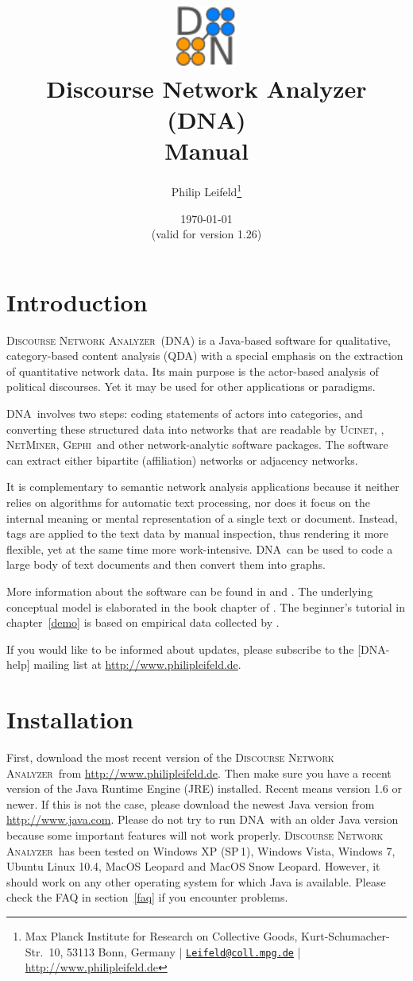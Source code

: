 \documentclass[12pt,a4paper]{scrreprt}
\author{Philip Leifeld\footnote{Max Planck Institute for Research on Collective Goods, Kurt-Schumacher-Str.~10, 53113 Bonn, Germany | \href{mailto:Leifeld@coll.mpg.de}{\texttt{Leifeld@coll.mpg.de}} | \url{http://www.philipleifeld.de}}}
\title{\includegraphics[width=2cm]{dna32.pdf}\\ \vspace{0.5cm} Discourse Network Analyzer (DNA)\\ \vspace{0.3cm} \textbf{Manual}}
\date{\today\\ \vspace{0.3cm} (valid for version 1.26)}
\newcommand{\visone}
{\textsf%
 {\protect\raisebox{.5ex}{\color[rgb]{0.1,0.1,0.1}v}%
  \protect\raisebox{.1ex}{\color[rgb]{0.3,0.3,0.3}i}%
  \protect\raisebox{-.1ex}{\color[rgb]{0.1,0.1,0.1}s}%
  \protect\raisebox{.1ex}{\color[rgb]{0.3,0.3,0.3}o}%
  \protect\raisebox{-.1ex}{\color[rgb]{0.1,0.1,0.1}n}%
  \protect\raisebox{-.4ex}{\color[rgb]{0.3,0.3,0.3}e}%
 }%
}
\newcommand{\ucinet}{\textsc{Ucinet}}
\newcommand{\dnalong}{\textsc{Discourse} \textsc{Network} \textsc{Analyzer}}
\newcommand{\dnashort}{\textsc{DNA}}
\newcommand{\netminer}{\textsc{NetMiner}}
\newcommand{\gephi}{\textsc{Gephi}}
\begin{document}
\maketitle
\setcounter{tocdepth}{2}
\tableofcontents

\chapter{Introduction}
\dnalong\ (\dnashort) is a Java-based software for qualitative, category-based content analysis (QDA) with a special emphasis on the extraction of quantitative network data. Its main purpose is the actor-based analysis of political discourses. Yet it may be used for other applications or paradigms.

\dnashort\ involves two steps: coding statements of actors into categories, and converting these structured data into networks that are readable by \ucinet, \visone, \netminer, \gephi\ and other network-analytic software packages. The software can extract either bipartite (affiliation) networks or adjacency networks.

It is complementary to semantic network analysis applications because it neither relies on algorithms for automatic text processing, nor does it focus on the internal meaning or mental representation of a single text or document. Instead, tags are applied to the text data by manual inspection, thus rendering it more flexible, yet at the same time more work-intensive. \dnashort\ can be used to code a large body of text documents and then convert them into graphs.

More information about the software can be found in \citet{leifeld2009die,leifeld2010political} and \citet{leifeld2010comparison}. The underlying conceptual model is elaborated in the book chapter of \citet{janning2009diskursnetzwerkanalyse.}. The beginner's tutorial in chapter~\ref{demo} is based on empirical data collected by \citet{fisher2009understanding}.

If you would like to be informed about updates, please subscribe to the [DNA-help] mailing list at \url{http://www.philipleifeld.de}.


\chapter{Installation}\label{installation}
First, download the most recent version of the \dnalong\ from \url{http://www.philipleifeld.de}. Then make sure you have a recent version of the Java Runtime Engine (JRE) installed. Recent means version 1.6 or newer. If this is not the case, please download the newest Java version from \url{http://www.java.com}. Please do not try to run \dnashort\ with an older Java version because some important features will not work properly. \dnalong\ has been tested on Windows XP (SP\,1), Windows Vista, Windows 7, Ubuntu Linux 10.4, MacOS Leopard and MacOS Snow Leopard. However, it should work on any other operating system for which Java is available. Please check the FAQ in section~\ref{faq} if you encounter problems.
\end{document}

